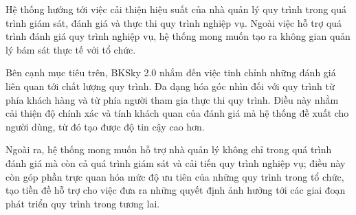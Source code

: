 Hệ thống hướng tới việc cải thiện hiệu suất của nhà quản lý quy trình trong quá
trình giám sát, đánh giá và thực thi quy trình nghiệp vụ. Ngoài việc hỗ trợ quá
trình đánh giá quy trình nghiệp vụ, hệ thống mong muốn tạo ra không gian quản
lý bám sát thực tế với tổ chức.

Bên cạnh mục tiêu trên, BKSky 2.0 nhắm đến việc tinh chỉnh những đánh giá liên
quan tới chất lượng quy trình. Đa dạng hóa góc nhìn đối với quy trình từ phía
khách hàng và từ phía người tham gia thực thi quy trình. Điều này nhằm cải
thiện độ chính xác và tính khách quan của đánh giá mà hệ thống đề xuất cho
người dùng, từ đó tạo được độ tin cậy cao hơn.

Ngoài ra, hệ thống mong muốn hỗ trợ nhà quản lý không chỉ trong quá trình đánh
giá mà còn cả quá trình giám sát và cải tiến quy trình nghiệp vụ; điều này còn
góp phần trực quan hóa mức độ ưu tiên của những quy trình trong tổ chức, tạo
tiền đề hỗ trợ cho việc đưa ra những quyết định ảnh hưởng tới các giai đoạn
phát triển quy trình trong tương lai.